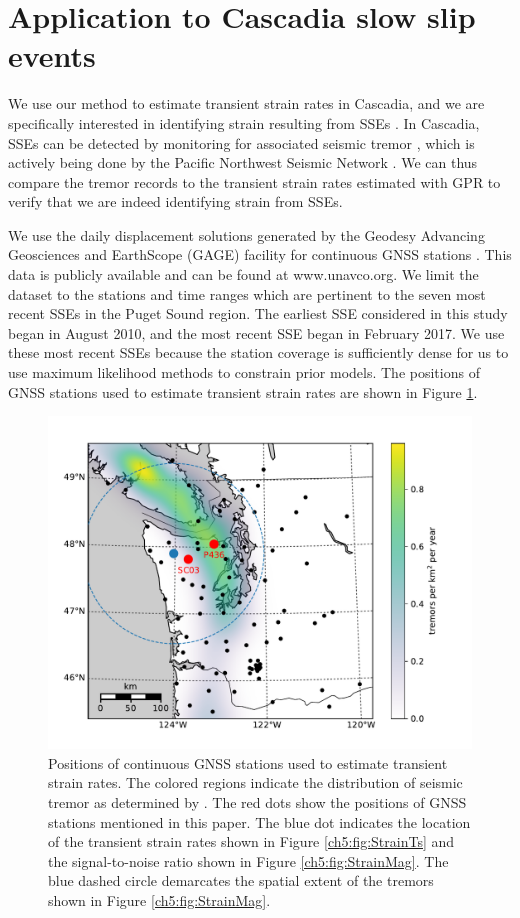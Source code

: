 \section{Application to Cascadia slow slip events}\label{ch5:sec:Cascadia}
We use our method to estimate transient strain rates in Cascadia, and we are specifically interested in identifying strain resulting from SSEs \citep[e.g.,][]{Dragert2001}. In Cascadia, SSEs can be detected by monitoring for associated seismic tremor \citep{Rogers2003}, which is actively being done by the Pacific Northwest Seismic Network \citep{Wech2010}. We can thus compare the tremor records to the transient strain rates estimated with GPR to verify that we are indeed identifying strain from SSEs.  

We use the daily displacement solutions generated by the Geodesy Advancing Geosciences and EarthScope (GAGE) facility for continuous GNSS stations \citep{Herring2016}. This data is publicly available and can be found at www.unavco.org. We limit the dataset to the stations and time ranges which are pertinent to the seven most recent SSEs in the Puget Sound region. The earliest SSE considered in this study began in August 2010, and the most recent SSE began in February 2017. We use these most recent SSEs because the station coverage is sufficiently dense for us to use maximum likelihood methods to constrain prior models.  The positions of GNSS stations used to estimate transient strain rates are shown in Figure \ref{ch5:fig:Context}.  

\begin{figure}
\includegraphics{ch5/figures/context_map/context-map.pdf}
\caption{Positions of continuous GNSS stations used to estimate transient strain rates. The colored regions indicate the distribution of seismic tremor as determined by \citet{Wech2010}. The red dots show the positions of GNSS stations mentioned in this paper. The blue dot indicates the location of the transient strain rates shown in Figure \ref{ch5:fig:StrainTs} and the signal-to-noise ratio shown in Figure \ref{ch5:fig:StrainMag}. The blue dashed circle demarcates the spatial extent of the tremors shown in Figure \ref{ch5:fig:StrainMag}.}    
\label{ch5:fig:Context}
\end{figure}

